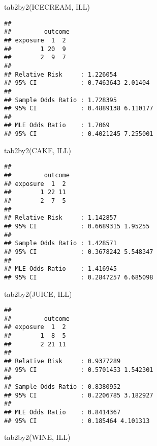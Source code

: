 \documentclass[
  12pt,
  a4paper]{book}
\newenvironment{Shaded}{\begin{snugshade}}{\end{snugshade}}
\newcommand{\FunctionTok}[1]{\textcolor[rgb]{0.00,0.00,0.00}{#1}}
\newcommand{\NormalTok}[1]{#1}
\begin{document}
\begin{Shaded}
\begin{Highlighting}[]
\FunctionTok{tab2by2}\NormalTok{(ICECREAM, ILL)}
\end{Highlighting}
\end{Shaded}

\begin{verbatim}
## 
##         outcome
## exposure  1  2
##        1 20  9
##        2  9  7
## 
## Relative Risk     : 1.226054 
## 95% CI            : 0.7463643 2.01404 
## 
## Sample Odds Ratio : 1.728395 
## 95% CI            : 0.4889138 6.110177 
## 
## MLE Odds Ratio    : 1.7069 
## 95% CI            : 0.4021245 7.255001
\end{verbatim}

\newpage

\begin{Shaded}
\begin{Highlighting}[]
\FunctionTok{tab2by2}\NormalTok{(CAKE, ILL)}
\end{Highlighting}
\end{Shaded}

\begin{verbatim}
## 
##         outcome
## exposure  1  2
##        1 22 11
##        2  7  5
## 
## Relative Risk     : 1.142857 
## 95% CI            : 0.6689315 1.95255 
## 
## Sample Odds Ratio : 1.428571 
## 95% CI            : 0.3678242 5.548347 
## 
## MLE Odds Ratio    : 1.416945 
## 95% CI            : 0.2847257 6.685098
\end{verbatim}

\begin{Shaded}
\begin{Highlighting}[]
\FunctionTok{tab2by2}\NormalTok{(JUICE, ILL)}
\end{Highlighting}
\end{Shaded}

\begin{verbatim}
## 
##         outcome
## exposure  1  2
##        1  8  5
##        2 21 11
## 
## Relative Risk     : 0.9377289 
## 95% CI            : 0.5701453 1.542301 
## 
## Sample Odds Ratio : 0.8380952 
## 95% CI            : 0.2206785 3.182927 
## 
## MLE Odds Ratio    : 0.8414367 
## 95% CI            : 0.185464 4.101313
\end{verbatim}

\newpage

\begin{Shaded}
\begin{Highlighting}[]
\FunctionTok{tab2by2}\NormalTok{(WINE, ILL)}
\end{Highlighting}
\end{Shaded}
\end{document}
